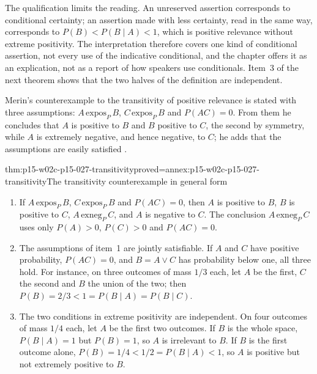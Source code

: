 The qualification limits the reading. An unreserved assertion corresponds
to conditional certainty; an assertion made with less certainty, read in
the same way, corresponds to \(P(B)<P(B\mid A)<1\), which is positive
relevance without extreme positivity. The interpretation therefore
covers one kind of conditional assertion, not every use of the
indicative conditional, and the chapter offers it as an explication, not
as a report of how speakers use conditionals. Item~3 of the next theorem
shows that the two halves of the definition are independent.

Merin's counterexample to the transitivity of positive relevance is
stated with three assumptions: \(A\,\mathrm{expos}_P\,B\),
\(C\,\mathrm{expos}_P\,B\) and \(P(AC)=0\). From them he concludes that
\(A\) is positive to \(B\) and \(B\) positive to \(C\), the second by
symmetry, while \(A\) is extremely negative, and hence negative, to \(C\);
he adds that the assumptions are easily satisfied
\cite[p.~267]{Merin2021Relevance}.

\begin{hbtheorem}{thm:p15-w02c-p15-027-transitivity}{proved=annex:p15-w02c-p15-027-transitivity}{The transitivity counterexample in general form}
\begin{enumerate}
\item If \(A\,\mathrm{expos}_P\,B\), \(C\,\mathrm{expos}_P\,B\) and
  \(P(AC)=0\), then \(A\) is positive to \(B\), \(B\) is positive to
  \(C\), \(A\,\mathrm{exneg}_P\,C\), and \(A\) is negative to \(C\).
  The conclusion \(A\,\mathrm{exneg}_P\,C\) uses only \(P(A)>0\),
  \(P(C)>0\) and \(P(AC)=0\).
\item The assumptions of item~1 are jointly satisfiable. If \(A\) and
  \(C\) have positive probability, \(P(AC)=0\), and \(B=A\vee C\) has
  probability below one, all three hold. For instance, on three outcomes
  of mass \(1/3\) each, let \(A\) be the first, \(C\) the second and
  \(B\) the union of the two; then
  \(P(B)=2/3<1=P(B\mid A)=P(B\mid C)\).
\item The two conditions in extreme positivity are independent. On four
  outcomes of mass \(1/4\) each, let \(A\) be the first two outcomes.
  If \(B\) is the whole space, \(P(B\mid A)=1\) but \(P(B)=1\), so \(A\)
  is irrelevant to \(B\). If \(B\) is the first outcome alone,
  \(P(B)=1/4<1/2=P(B\mid A)<1\), so \(A\) is positive but not extremely
  positive to \(B\).
\end{enumerate}
\end{hbtheorem}

